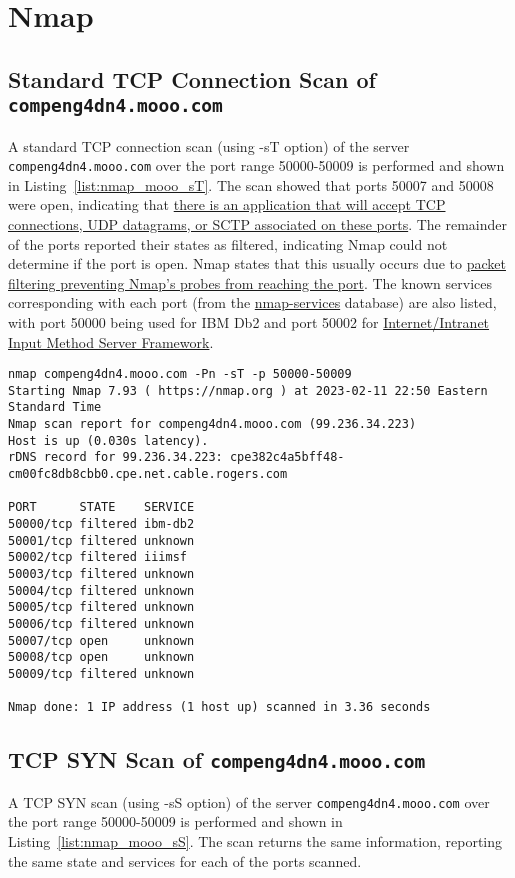 \section*{Nmap}
\subsection*{Standard TCP Connection Scan of \texttt{compeng4dn4.mooo.com}}
A standard TCP connection scan (using -sT option) of the server \texttt{compeng4dn4.mooo.com} over the port range 50000-50009 is performed and shown in Listing~\ref{list:nmap_mooo_sT}. The scan showed that ports 50007 and 50008 were open, indicating that \href{https://nmap.org/book/man-port-scanning-basics.html}{there is an application that will accept TCP connections, UDP datagrams, or SCTP associated on these ports}. The remainder of the ports reported their states as filtered, indicating Nmap could not determine if the port is open. Nmap states that this usually occurs due to \href{https://nmap.org/book/man-port-scanning-basics.html}{packet filtering preventing Nmap's probes from reaching the port}. The known services corresponding with each port (from the \href{https://nmap.org/book/man-version-detection.html}{nmap-services} database) are also listed, with port 50000 being used for IBM Db2 and port 50002 for \href{http://openi18n.web.fc2.com/subgroups/im/IIIMF/faq/FAQ.html}{Internet/Intranet Input Method Server Framework}.

\begin{lstlisting}[caption=Nmap Standard TCP Connection Scan Over Port Range 50000-50009,label=list:nmap_mooo_sT]
nmap compeng4dn4.mooo.com -Pn -sT -p 50000-50009
Starting Nmap 7.93 ( https://nmap.org ) at 2023-02-11 22:50 Eastern Standard Time
Nmap scan report for compeng4dn4.mooo.com (99.236.34.223)
Host is up (0.030s latency).
rDNS record for 99.236.34.223: cpe382c4a5bff48-cm00fc8db8cbb0.cpe.net.cable.rogers.com

PORT      STATE    SERVICE
50000/tcp filtered ibm-db2
50001/tcp filtered unknown
50002/tcp filtered iiimsf
50003/tcp filtered unknown
50004/tcp filtered unknown
50005/tcp filtered unknown
50006/tcp filtered unknown
50007/tcp open     unknown
50008/tcp open     unknown
50009/tcp filtered unknown

Nmap done: 1 IP address (1 host up) scanned in 3.36 seconds
\end{lstlisting}


\subsection*{TCP SYN Scan of \texttt{compeng4dn4.mooo.com}}
A TCP SYN scan (using -sS option) of the server \texttt{compeng4dn4.mooo.com} over the port range 50000-50009 is performed and shown in Listing~\ref{list:nmap_mooo_sS}. The scan returns the same information, reporting the same state and services for each of the ports scanned.


